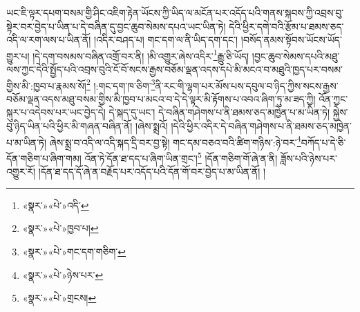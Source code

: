 ཡང་ཇི་ལྟར་དཔག་བསམ་གྱི་ཤིང་འཇིག་རྟེན་ཡོངས་ཀྱི་ཡིད་ལ་མངོན་པར་འདོད་པའི་གནས་སྐབས་ཀྱི་འབྲས་བུ་སྟེར་བར་བྱེད་པ་ཡིན་པ་དེ་བཞིན་དུ་བྱང་ཆུབ་སེམས་དཔའ་ཡང་ཡིན་ཏེ། དེའི་ཕྱིར་དགེ་བའི་རྩོམ་པ་ཐམས་ཅད་འདི་ལ་རག་ལས་པ་ཡིན་ནོ། །འདིར་བཤད་པ། གང་དག་ལ་ནི་ཡིད་དག་དང་། །བསོད་ནམས་སྟོབས་ཡོངས་ཡོད་གྱུར་པ། །དེ་དག་བསམས་བཞིན་འགྲོ་བར་ནི། །མི་འགྱུར་ཞེས་འདིར་\footnote{«སྣར་»«པེ་»འདི་}རྒྱུ་ཅི་ཡོད། །བྱང་ཆུབ་སེམས་དཔའི་མཐུ་ལས་ཀྱང་དེའི་སྤྱོད་པའི་འབྲས་བུའི་ངོ་བོ་སངས་རྒྱས་བཅོམ་ལྡན་འདས་དཔེ་མི་མངའ་བ་མཐུའི་ཁྱད་པར་བསམ་གྱིས་མི་:ཁྱབ་པ་རྣམས་སོ།\footnote{«སྣར་»«པེ་»ཁྱབ་པ།} །:གང་དག་ཁ་ཅིག་\footnote{«སྣར་»«པེ་»གང་དག་གཅིག་}ནི་རང་གི་ལྷག་པར་མོས་པས་དབུལ་བ་ཉིད་ཀྱིས་སངས་རྒྱས་བཅོམ་ལྡན་འདས་མཐུ་བསམ་གྱིས་མི་ཁྱབ་པ་མངའ་བ་དེ་དེ་ལྟར་མི་རྟོགས་པ་འབའ་ཞིག་ཏུ་མ་ཟད་ཀྱི། འོན་ཀྱང་སྐུར་པ་འདེབས་པར་ཡང་བྱེད་དེ། དེ་སྐད་དུ་ཡང་། དེ་བཞིན་གཤེགས་པ་ནི་ཐམས་ཅད་མཁྱེན་པ་མ་ཡིན་ཏེ། སྐྱེས་བུ་ཉིད་ཡིན་པའི་ཕྱིར་མི་གཞན་བཞིན་ནོ། །ཞེས་སྨྲའོ། །དེའི་ཕྱིར་འདིར་དེ་བཞིན་གཤེགས་པ་ནི་ཐམས་ཅད་མཁྱེན་པ་མ་ཡིན་ཏེ། ཞེས་སྨྲ་བ་འདི་ལ་འདི་སྐད་དྲི་བར་བྱ་སྟེ། གང་དམ་བཅའ་བའི་ཚིག་གཉིས་:ཉེ་བར་\footnote{«སྣར་»«པེ་»ཉེས་པར་}བཀོད་པ་དེ་ཅི་དོན་གཅིག་པ་ཞིག་གམ། འོན་ཏེ་དོན་ཐ་དད་པ་ཞིག་ཡིན་གྲང་།\footnote{«སྣར་»«པེ་»གྲངས།} །དོན་གཅིག་གོ་ཞེ་ན་ནི། ཟློས་པའི་ཉེས་པར་འགྱུར་རོ། །དོན་ཐ་དད་དོ་ཞེ་ན་བརྗོད་པར་འདོད་པའི་དོན་གོ་བར་བྱེད་པ་མ་ཡིན་ནོ། །

